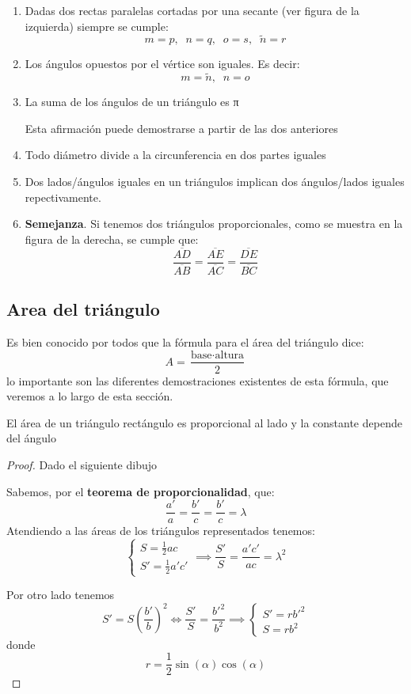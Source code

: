 \documentclass{apuntes}
\begin{document}
\begin{theorem}
\begin{enumerate}
\item Dadas dos rectas paralelas cortadas por una secante (ver figura de la izquierda) siempre se cumple:
\[m=p, \;\; n=q, \;\; o=s, \;\; \tilde{n}=r\]

\item Los ángulos opuestos por el vértice son iguales. Es decir:
\[m=\tilde{n}, \;\; n=o\]

\item La suma de los ángulos de un triángulo es π

\obs Esta afirmación puede demostrarse a partir de las dos anteriores

\item Todo diámetro divide a la circunferencia en dos partes iguales

\item Dos lados/ángulos iguales en un triángulos implican dos ángulos/lados iguales repectivamente.

\item \textbf{Semejanza}. Si tenemos dos triángulos proporcionales, como se muestra en la figura de la derecha, se cumple que:
\[\frac{\overline{AD}}{\overline{AB}} = \frac{\overline{AE}}{\overline{AC}} =\frac{\overline{DE}}{\overline{BC}}\]
\end{enumerate}
\end{theorem}


\subsection{Area del triángulo}
Es bien conocido por todos que la fórmula para el área del triángulo dice:
\[A= \frac{\text{base}\cdot\text{altura}}{2}\]
lo importante son las diferentes demostraciones existentes de esta fórmula, que veremos a lo largo de esta sección.

\begin{lemma}
El área de un triángulo rectángulo es proporcional al lado y la constante depende del ángulo
\end{lemma}
\begin{proof}
Dado el siguiente dibujo
\begin{center}
\end{center}
Sabemos, por el \textbf{teorema de proporcionalidad}, que:
\[\frac{a'}{a} = \frac{b'}{c} = \frac{b'}{c} = λ\]
Atendiendo a las áreas de los triángulos representados tenemos:
\[\left\{ \begin{array}{l} S= \frac{1}{2}ac \\ S' = \frac{1}{2} a'c'\end{array}\right. \implies \frac{S'}{S} =\frac{a'c'}{ac} = λ^2\]

Por otro lado tenemos
\[S' = S\left( \frac{b'}{b}\right)^2 \iff \frac{S'}{S} = \frac{b'^2}{b^2} \implies \left\{ \begin{array}{l} S' = rb'^2 \\ S= r b^2 \end{array}\right.\]
donde 
\[r=\frac{1}{2} \sin(α)\cos(α)\]
\end{proof}
\end{document}
